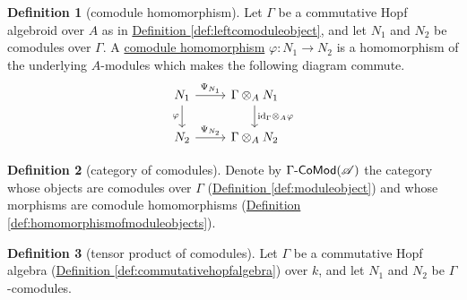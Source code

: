 \documentclass[a4paper]{report}
\newcommand{\defn}[1]{\ul{#1}}
\def\mhyp{{\hbox{-}}}
\theoremstyle{definition}
\newtheorem{definition}{Definition}[section]
\theoremstyle{plain}
\theoremstyle{remark}
\begin{document}
\begin{definition}[comodule homomorphism]
  \label{def:comodulehomomorphism}
  Let $\Gamma$ be a commutative Hopf algebroid over $A$ as in \hyperref[def:leftcomoduleobject]{Definition \ref*{def:leftcomoduleobject}}, and let $N_{1}$ and $N_{2}$ be comodules over $\Gamma$. A \defn{comodule homomorphism} $\varphi\colon N_{1} \to N_{2}$ is a homomorphism of the underlying $A$-modules which makes the following diagram commute.
  \begin{equation*}
    \begin{tikzcd}
      N_{1} 
      \arrow[r, "\Psi_{N_{1}}"]
      \arrow[d, swap, "\varphi"]
      & \Gamma \otimes_{A} N_{1}
      \arrow[d, "\mathrm{id}_{\Gamma}\otimes_{A} \varphi"]
      \\
      N_{2} 
      \arrow[r, "\Psi_{N_{2}}"]
      & \Gamma \otimes_{A} N_{2}
    \end{tikzcd}
  \end{equation*}
\end{definition}

\begin{definition}[category of comodules]
  \label{def:categoryofcomodules}
  Denote by $\Gamma\mhyp\mathsf{CoMod}(\mathscr{A})$ the category whose objects are comodules over $\Gamma$ (\hyperref[def:moduleobject]{Definition \ref*{def:moduleobject}}) and whose morphisms are comodule homomorphisms (\hyperref[def:homomorphismofmoduleobjects]{Definition \ref*{def:homomorphismofmoduleobjects}}).
\end{definition}

\begin{definition}[tensor product of comodules]
  \label{def:tensorproductofcomodules}
  Let $\Gamma$ be a commutative Hopf algebra (\hyperref[def:commutativehopfalgebra]{Definition \ref*{def:commutativehopfalgebra}}) over $k$, and let $N_{1}$ and $N_{2}$ be $\Gamma$-comodules.
\end{definition}
\end{document}
